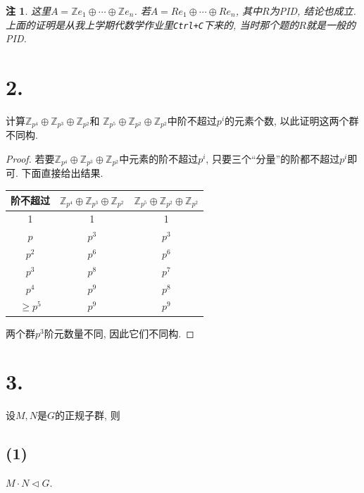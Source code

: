 \documentclass[12pt, a4paper, fontset=windows]{ctexart}
\newcommand{\Z}{\mathbb{Z}}
\newcommand{\yh}[1]{“{#1}”} %
\newtheorem*{remark}{注}
\begin{document}
\begin{remark}
这里$A=\Z e_1\oplus\cdots\oplus\Z e_n$. 
若$A=Re_1\oplus\cdots\oplus Re_n$, 其中$R$为{\rm PID}, 结论也成立. 
上面的证明是从我上学期代数学作业里{\tt Ctrl+C}下来的, 当时那个题的$R$就是一般的{\rm PID}. 
\end{remark}

\section*{2.}
\label{ord-count}

计算$\Z_{p^4}\oplus\Z_{p^3}\oplus\Z_{p^2}$和
$\Z_{p^5}\oplus\Z_{p^2}\oplus\Z_{p^2}$中阶不超过$p^i$的元素个数, 
以此证明这两个群不同构. 

\begin{proof}
若要$\Z_{p^4}\oplus\Z_{p^3}\oplus\Z_{p^2}$中元素的阶不超过$p^i$, 
只要三个\yh{分量}的阶都不超过$p^i$即可. 下面直接给出结果. 

\vspace{1em}

\begin{center}\begin{tabular}{c|c c}
阶不超过 & $\Z_{p^4}\oplus\Z_{p^3}\oplus\Z_{p^2}$ & $\Z_{p^5}\oplus\Z_{p^2}\oplus\Z_{p^2}$\\
\hline
1 & 1 & 1\\
$p$ & $p^3$ & $p^3$\\
$p^2$ & $p^6$ & $p^6$\\
$p^3$ & $p^8$ & $p^7$\\
$p^4$ & $p^9$ & $p^8$\\
$\ge p^5$ & $p^9$ & $p^9$
\end{tabular}\end{center}

\vspace{1em}

两个群$p^3$阶元数量不同, 因此它们不同构. 
\end{proof}

\section*{3.}

设$M,N$是$G$的正规子群, 则

\subsection*{(1)}

$M\cdot N\lhd G$. 
\end{document}
